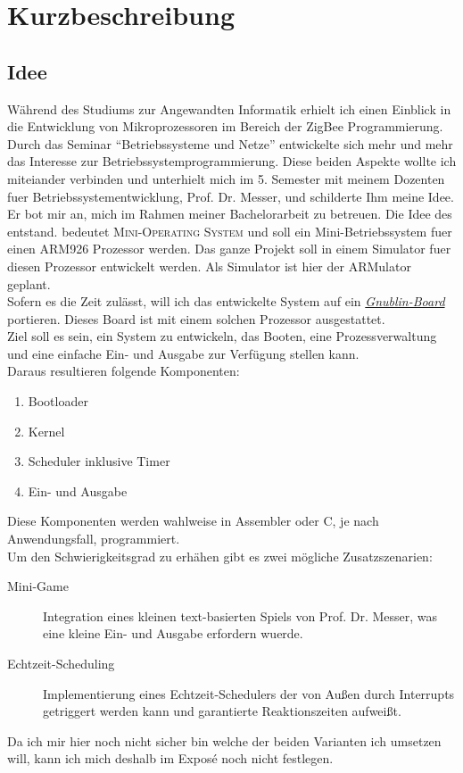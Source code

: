 \documentclass[fontsize=12pt]{scrreprt}
\begin{document}
\onehalfspacing



\tableofcontents

\chapter{Kurzbeschreibung}

\section{Idee}
W\"ahrend des Studiums zur Angewandten Informatik erhielt ich einen Einblick in die Entwicklung von Mikroprozessoren im Bereich der ZigBee Programmierung.
Durch das Seminar ``Betriebssysteme und Netze'' entwickelte sich mehr und mehr das Interesse zur Betriebssystemprogrammierung. Diese beiden Aspekte wollte ich miteiander verbinden und unterhielt mich im 5. Semester mit meinem Dozenten fuer Betriebssystementwicklung, Prof. Dr. Messer,  und schilderte Ihm meine Idee. Er bot mir an, mich im Rahmen meiner Bachelorarbeit zu betreuen. Die Idee des \mops entstand. \mops bedeutet \textsc{Mini-Operating System} und soll ein Mini-Betriebssystem fuer einen ARM926 Prozessor werden.
Das ganze Projekt soll in einem Simulator fuer diesen Prozessor entwickelt werden. Als Simulator ist hier der ARMulator geplant.\\
Sofern es die Zeit zul\"asst, will ich das entwickelte System auf ein \textit{\href{http://wiki.gnublin.org/index.php/GNUBLIN-Standard}{Gnublin-Board}} portieren. Dieses Board ist mit einem solchen Prozessor ausgestattet.\\ 
Ziel soll es sein, ein System zu entwickeln, das Booten, eine Prozessverwaltung und eine einfache Ein- und Ausgabe zur Verf\"ugung stellen kann.\\
Daraus resultieren folgende Komponenten:
\begin{enumerate}
	\item Bootloader
	\item Kernel
	\item Scheduler inklusive Timer
	\item Ein- und Ausgabe
\end{enumerate} 
\newpage
\noindent
Diese Komponenten werden wahlweise in Assembler oder C, je nach Anwendungsfall, programmiert.\\
Um den Schwierigkeitsgrad zu erh\"ahen gibt es zwei m\"ogliche Zusatzszenarien:
\begin{description}
	\item[Mini-Game] Integration eines kleinen text-basierten Spiels von Prof. Dr. Messer, was eine kleine Ein- und Ausgabe erfordern wuerde.
	\item[Echtzeit-Scheduling] Implementierung eines Echtzeit-Schedulers der von Außen durch Interrupts getriggert werden kann und garantierte Reaktionszeiten aufweißt.
\end{description}
Da ich mir hier noch nicht sicher bin welche der beiden Varianten ich umsetzen will, kann ich mich deshalb im Exposé noch nicht festlegen.
\end{document}
